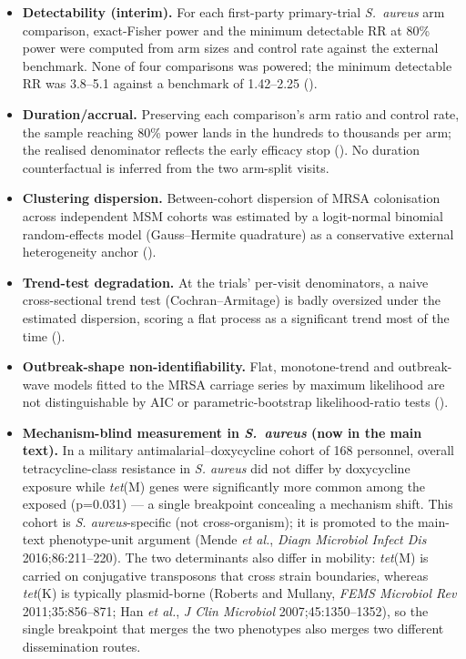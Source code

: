 \documentclass[11pt,a4paper]{article}
\newcommand{\sa}{\emph{S.~aureus}}
\begin{document}
\begin{itemize}
\item \textbf{Detectability (interim).} For each first-party primary-trial \sa{}
arm comparison, exact-Fisher power and the minimum detectable RR at 80\% power
were computed from arm sizes and control rate against the external benchmark. None
of four comparisons was powered; the minimum detectable RR was 3.8--5.1 against a
benchmark of 1.42--2.25 ().
\item \textbf{Duration/accrual.} Preserving each comparison's arm ratio and
control rate, the sample reaching 80\% power lands in the hundreds to thousands per
arm; the realised denominator reflects the early efficacy stop
(). No duration counterfactual is inferred from
the two arm-split visits.
\item \textbf{Clustering dispersion.} Between-cohort dispersion of MRSA
colonisation across independent MSM cohorts was estimated by a logit-normal
binomial random-effects model (Gauss--Hermite quadrature) as a conservative
external heterogeneity anchor ().
\item \textbf{Trend-test degradation.} At the trials' per-visit denominators, a
naive cross-sectional trend test (Cochran--Armitage) is badly oversized under the
estimated dispersion, scoring a flat process as a significant trend most of the
time ().
\item \textbf{Outbreak-shape non-identifiability.} Flat, monotone-trend and
outbreak-wave models fitted to the MRSA carriage series by maximum likelihood are
not distinguishable by AIC or parametric-bootstrap likelihood-ratio tests
().
\item \textbf{Mechanism-blind measurement in \sa{} (now in the main text).} In a
military antimalarial--doxycycline cohort of 168 personnel, overall
tetracycline-class resistance in \emph{S. aureus} did not differ by doxycycline
exposure while \emph{tet}(M) genes were significantly more common among the
exposed (p=0.031) --- a single breakpoint concealing a mechanism shift. This
cohort is \emph{S. aureus}-specific (not cross-organism); it is promoted to the
main-text phenotype-unit argument (Mende \textit{et al.}, \textit{Diagn Microbiol
Infect Dis} 2016;86:211--220). The two determinants also differ in mobility:
\emph{tet}(M) is carried on conjugative transposons that cross strain boundaries,
whereas \emph{tet}(K) is typically plasmid-borne (Roberts and Mullany, \textit{FEMS
Microbiol Rev} 2011;35:856--871; Han \textit{et al.}, \textit{J Clin Microbiol}
2007;45:1350--1352), so the single breakpoint that merges the two phenotypes also
merges two different dissemination routes.
\end{itemize}
\end{document}
